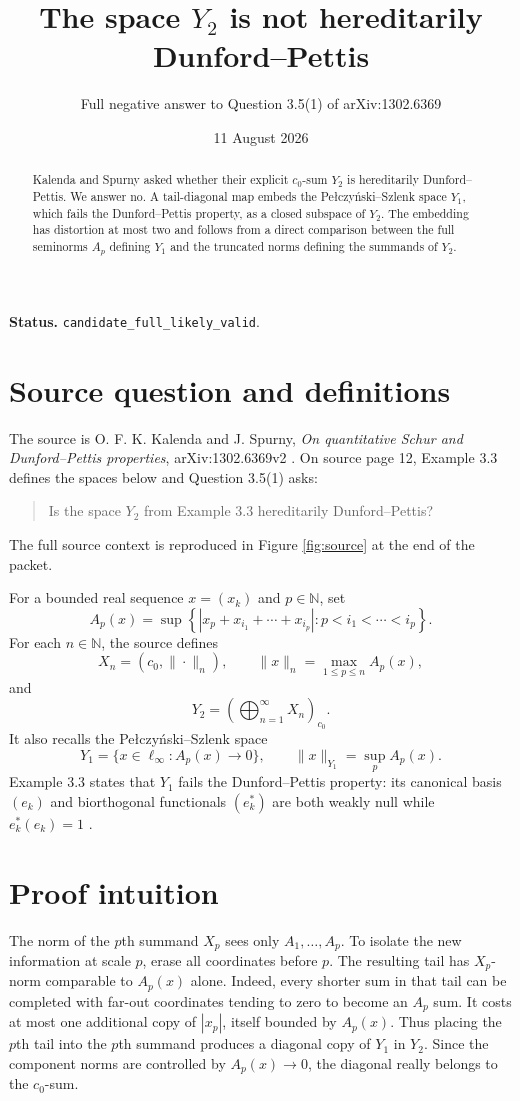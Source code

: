 \documentclass[11pt]{article}
\title{The space $Y_2$ is not hereditarily Dunford--Pettis}
\author{Full negative answer to Question 3.5(1) of arXiv:1302.6369}
\date{11 August 2026}
\newcommand{\N}{\mathbb N}
\begin{document}
\maketitle

\noindent\textbf{Status.} \texttt{candidate\_full\_likely\_valid}.

\begin{abstract}
Kalenda and Spurny asked whether their explicit $c_0$-sum $Y_2$ is
hereditarily Dunford--Pettis. We answer no. A tail-diagonal map embeds the
Pe\l czy\'nski--Szlenk space $Y_1$, which fails the Dunford--Pettis property,
as a closed subspace of $Y_2$. The embedding has distortion at most two and
follows from a direct comparison between the full seminorms $A_p$ defining
$Y_1$ and the truncated norms defining the summands of $Y_2$.
\end{abstract}

\section{Source question and definitions}

The source is O. F. K. Kalenda and J. Spurny, \emph{On quantitative Schur and
Dunford--Pettis properties}, arXiv:1302.6369v2 \cite{source}. On source page 12,
Example 3.3 defines the spaces below and Question 3.5(1) asks:
\begin{quote}
Is the space $Y_2$ from Example 3.3 hereditarily Dunford--Pettis?
\end{quote}
The full source context is reproduced in Figure \ref{fig:source} at the end of
the packet.

For a bounded real sequence $x=(x_k)$ and $p\in\N$, set
\[
 A_p(x)=\sup\left\{\left|x_p+x_{i_1}+\cdots+x_{i_p}\right|:
 p<i_1<\cdots<i_p\right\}.
\]
For each $n\in\N$, the source defines
\[
 X_n=(c_0,\|\cdot\|_n),\qquad
 \|x\|_n=\max_{1\le p\le n}A_p(x),
\]
and
\[
 Y_2=\left(\bigoplus_{n=1}^\infty X_n\right)_{c_0}.
\]
It also recalls the Pe\l czy\'nski--Szlenk space
\[
 Y_1=\{x\in\ell_\infty:A_p(x)\to0\},\qquad
 \|x\|_{Y_1}=\sup_p A_p(x).
\]
Example 3.3 states that $Y_1$ fails the Dunford--Pettis property: its canonical
basis $(e_k)$ and biorthogonal functionals $(e_k^*)$ are both weakly null while
$e_k^*(e_k)=1$ \cite{source,PS}.

\section{Proof intuition}

The norm of the $p$th summand $X_p$ sees only $A_1,\ldots,A_p$. To isolate the
new information at scale $p$, erase all coordinates before $p$. The resulting
tail has $X_p$-norm comparable to $A_p(x)$ alone. Indeed, every shorter sum in
that tail can be completed with far-out coordinates tending to zero to become
an $A_p$ sum. It costs at most one additional copy of $|x_p|$, itself bounded
by $A_p(x)$. Thus placing the $p$th tail into the $p$th summand produces a
diagonal copy of $Y_1$ in $Y_2$. Since the component norms are controlled by
$A_p(x)\to0$, the diagonal really belongs to the $c_0$-sum.
\end{document}
